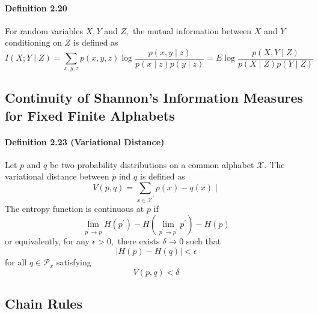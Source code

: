\documentclass[8pt]{article}
\begin{document}
\begin{tcolorbox}
\paragraph{Definition 2.20} For random variables $X, Y$ and $Z,$ the mutual information between $X$ and $Y$ conditioning on $Z$ is defined as
$$
I(X ; Y \mid Z)=\sum_{x, y, z} p(x, y, z) \log \frac{p(x, y \mid z)}{p(x \mid z) p(y \mid z)}=E \log \frac{p(X, Y \mid Z)}{p(X \mid Z) p(Y \mid Z)}
$$
\end{tcolorbox}

\newpage
\subsection{Continuity of Shannon's Information Measures for Fixed Finite Alphabets}
\begin{tcolorbox}
\paragraph{Definition 2.23 (Variational Distance)} Let $p$ and $q$ be two probability distributions on a common alphabet $\mathcal{X}$. 'l'he variational distance between $p$ ind $q$ is defined as
$$
V(p, q)=\sum_{x \in \mathcal{X}^{\prime}} p(x)-q(x) \mid
$$
The entropy funetion is continuous at $p$ if
$$
\lim _{p^{\prime} \rightarrow p} H\left(p^{\prime}\right)-H\left(\lim _{p^{\prime} \rightarrow p^{\prime}} p^{\prime}\right)-H(p)
$$
or equivalently, for any $\epsilon>0,$ there exists $\delta \rightarrow 0$ such that
$$
\mid H(p)-H(q) \mid < \epsilon
$$
for all $q \in \mathcal{P}_{x}$ satisfying
$$
V(p, q)<\delta
$$
\end{tcolorbox}

\newpage
\subsection{Chain Rules}
\end{document}
